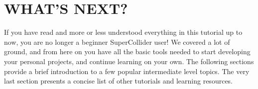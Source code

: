 \documentclass[11pt]{article}
\begin{document}
\part{WHAT'S NEXT?}
If you have read and more or less understood everything in this tutorial up to now, you are no longer a beginner SuperCollider user! We covered a lot of ground, and from here on you have all the basic tools needed to start developing your personal projects, and continue learning on your own. The following sections provide a brief introduction to a few popular intermediate level topics. The very last section presents a concise list of other tutorials and learning resources.






\newpage
\theendnotes

\end{document}
